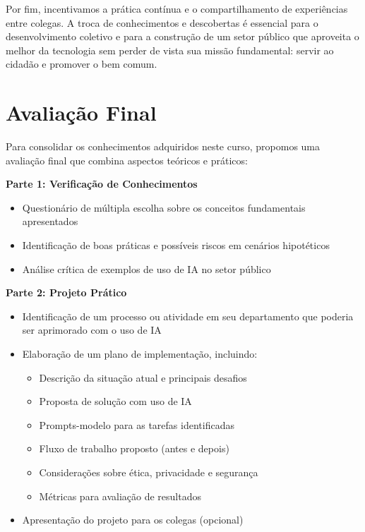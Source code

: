 \documentclass[12pt,a4paper]{book}
\begin{document}
Por fim, incentivamos a prática contínua e o compartilhamento de experiências entre colegas. A troca de conhecimentos e descobertas é essencial para o desenvolvimento coletivo e para a construção de um setor público que aproveita o melhor da tecnologia sem perder de vista sua missão fundamental: servir ao cidadão e promover o bem comum.

\chapter*{Avaliação Final}

Para consolidar os conhecimentos adquiridos neste curso, propomos uma avaliação final que combina aspectos teóricos e práticos:

\textbf{Parte 1: Verificação de Conhecimentos}
\begin{itemize}
    \item Questionário de múltipla escolha sobre os conceitos fundamentais apresentados
    \item Identificação de boas práticas e possíveis riscos em cenários hipotéticos
    \item Análise crítica de exemplos de uso de IA no setor público
\end{itemize}

\textbf{Parte 2: Projeto Prático}
\begin{itemize}
    \item Identificação de um processo ou atividade em seu departamento que poderia ser aprimorado com o uso de IA
    \item Elaboração de um plano de implementação, incluindo:
    \begin{itemize}
        \item Descrição da situação atual e principais desafios
        \item Proposta de solução com uso de IA
        \item Prompts-modelo para as tarefas identificadas
        \item Fluxo de trabalho proposto (antes e depois)
        \item Considerações sobre ética, privacidade e segurança
        \item Métricas para avaliação de resultados
    \end{itemize}
    \item Apresentação do projeto para os colegas (opcional)
\end{itemize}
\end{document}
